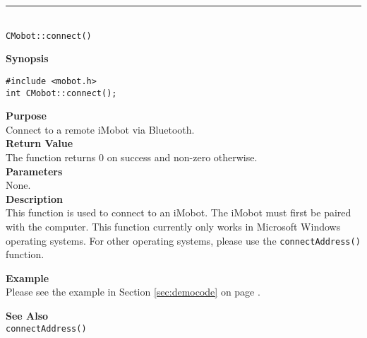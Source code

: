 \noindent
\vspace{5pt}
\rule{4.5in}{0.015in}\\
\noindent
{\LARGE \texttt{CMobot::connect()}}\\
{}

\noindent
{\bf Synopsis}\\
\begin{verbatim}
#include <mobot.h>
int CMobot::connect();
\end{verbatim}

\noindent
{\bf Purpose}\\
Connect to a remote iMobot via Bluetooth.\\

\noindent
{\bf Return Value}\\
The function returns 0 on success and non-zero otherwise.\\

\noindent
{\bf Parameters}\\
None.\\

\noindent
{\bf Description}\\
This function is used to connect to an iMobot. The iMobot must first be paired
with the computer. This function currently only works in Microsoft Windows
operating systems. For other operating systems, please use the
\texttt{connectAddress()} function.

\noindent
{\bf Example}\\
Please see the example in Section \ref{sec:democode} on page \pageref{sec:democode}.\\
\noindent

\noindent
{\bf See Also}\\
\texttt{connectAddress()}

